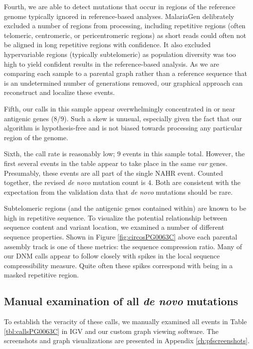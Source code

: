 Fourth, we are able to detect mutations that occur in regions of the reference genome typically ignored in reference-based analyses.  MalariaGen delibrately excluded a number of regions from processing, including repetitive regions (often telomeric, centromeric, or pericentromeric regions) as short reads could often not be aligned in long repetitive regions with confidence.  It also excluded hypervariable regions (typically subtelomeric) as population diversity was too high to yield confident results in the reference-based analysis.  As we are comparing each sample to a parental graph rather than a reference sequence that is an undetermined number of generations removed, our graphical approach can reconstruct and localize these events.

Fifth, our calls in this sample appear overwhelmingly concentrated in or near antigenic genes ($8$/$9$).  Such a skew is unusual, especially given the fact that our algorithm is hypothesis-free and is not biased towards processing any particular region of the genome.

Sixth, the call rate is reasonably low; $9$ events in this sample total.  However, the first several events in the table appear to take place in the same \textit{var} genes.  Presumably, these events are all part of the single NAHR event.  Counted together, the revised \textit{de novo} mutation count is $4$.  Both are consistent with the expectation from the validation data that \textit{de novo} mutations should be rare.

Subtelomeric regions (and the antigenic genes contained within) are known to be high in repetitive sequence.  To visualize the potential relationship between sequence content and variant location, we examined a number of different sequence properties.  Shown in Figure \ref{fig:circosPG0063C} above each parental assembly track is one of these metrics: the sequence compression ratio.  Many of our DNM calls appear to follow closely with spikes in the local sequence compressibility measure.  Quite often these spikes correspond with being in a masked repetitive region.

\subsection{Manual examination of all \textit{de novo} mutations}

To establish the veracity of these calls, we manually examined all events in Table \ref{tbl:callsPG0063C} in IGV and our custom graph viewing software.  The screenshots and graph visualizations are presented in Appendix \ref{ch:pfscreenshots}.

